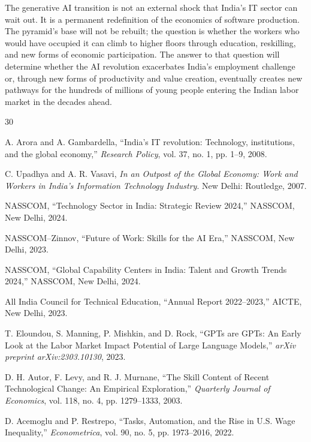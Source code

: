 \documentclass[conference]{IEEEtran}
\begin{document}
The generative AI transition is not an external shock that India's IT sector can wait out. It is a permanent redefinition of the economics of software production. The pyramid's base will not be rebuilt; the question is whether the workers who would have occupied it can climb to higher floors through education, reskilling, and new forms of economic participation. The answer to that question will determine whether the AI revolution exacerbates India's employment challenge or, through new forms of productivity and value creation, eventually creates new pathways for the hundreds of millions of young people entering the Indian labor market in the decades ahead.

\begin{thebibliography}{30}

A. Arora and A. Gambardella,
``India's IT revolution: Technology, institutions, and the global economy,''
\textit{Research Policy}, vol. 37, no. 1, pp. 1--9, 2008.

C. Upadhya and A. R. Vasavi,
\textit{In an Outpost of the Global Economy: Work and Workers in India's Information Technology Industry}.
New Delhi: Routledge, 2007.

NASSCOM,
``Technology Sector in India: Strategic Review 2024,''
NASSCOM, New Delhi, 2024.

NASSCOM--Zinnov,
``Future of Work: Skills for the AI Era,''
NASSCOM, New Delhi, 2023.

NASSCOM,
``Global Capability Centers in India: Talent and Growth Trends 2024,''
NASSCOM, New Delhi, 2024.

All India Council for Technical Education,
``Annual Report 2022--2023,''
AICTE, New Delhi, 2023.

T. Eloundou, S. Manning, P. Mishkin, and D. Rock,
``GPTs are GPTs: An Early Look at the Labor Market Impact Potential of Large Language Models,''
\textit{arXiv preprint arXiv:2303.10130}, 2023.

D. H. Autor, F. Levy, and R. J. Murnane,
``The Skill Content of Recent Technological Change: An Empirical Exploration,''
\textit{Quarterly Journal of Economics}, vol. 118, no. 4, pp. 1279--1333, 2003.

D. Acemoglu and P. Restrepo,
``Tasks, Automation, and the Rise in U.S. Wage Inequality,''
\textit{Econometrica}, vol. 90, no. 5, pp. 1973--2016, 2022.


\end{thebibliography}
\end{document}
